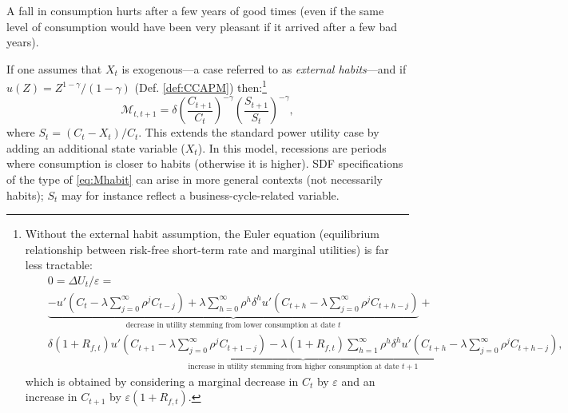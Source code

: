 \documentclass[
  12pt,
]{book}
\theoremstyle{definition}
\theoremstyle{definition}
\theoremstyle{definition}
\theoremstyle{definition}
\theoremstyle{remark}
\begin{document}
A fall in consumption hurts after a few years of good times (even if the same level of consumption would have been very pleasant if it arrived after a few bad years).

If one assumes that \(X_t\) is exogenous---a case referred to as \emph{external habits}---and if \(u(Z)=Z^{1-\gamma}/(1-\gamma)\) (Def. \ref{def:CCAPM}) then:\footnote{Without the external habit assumption, the Euler equation (equilibrium relationship between risk-free short-term rate and marginal utilities) is far less tractable:
  \begin{eqnarray*}
  && 0 = \Delta U_t / \varepsilon =\\
  && \underbrace{ - u'\left(C_{t} - \lambda \sum_{j=0}^\infty \rho^j C_{t-j}\right) + \lambda  \sum_{h=0}^{\infty} \rho^h \delta^{h}u'\left(C_{t+h} - \lambda \sum_{j=0}^\infty \rho^j C_{t+h-j}\right)}_{\mbox{decrease in utility stemming from lower consumption at date $t$}} +\\
  && \underbrace{\delta(1+R_{f,t}) u'\left(C_{t+1} - \lambda \sum_{j=0}^\infty \rho^j C_{t+1-j}\right) - \lambda (1+R_{f,t}) \sum_{h=1}^{\infty} \rho^h \delta^{h}u'\left(C_{t+h} - \lambda \sum_{j=0}^\infty \rho^j C_{t+h-j}\right)}_{\mbox{increase in utility stemming from higher consumption at date $t+1$}},
  \end{eqnarray*}
  which is obtained by considering a marginal decrease in \(C_t\) by \(\varepsilon\) and an increase in \(C_{t+1}\) by \(\varepsilon(1+R_{f,t})\).}
\begin{equation}
\mathcal{M}_{t,t+1} = \delta \left( \frac{C_{t+1}}{C_t} \right)^{-\gamma}\left( \frac{S_{t+1}}{S_t} \right)^{-\gamma},\label{eq:Mhabit}
\end{equation}
where \(S_t = (C_t - X_t)/C_t\). This extends the standard power utility case by adding an additional state variable (\(X_t\)). In this model, recessions are periods where consumption is closer to habits (otherwise it is higher). SDF specifications of the type of \eqref{eq:Mhabit} can arise in more general contexts (not necessarily habits); \(S_t\) may for instance reflect a business-cycle-related variable.
\end{document}
